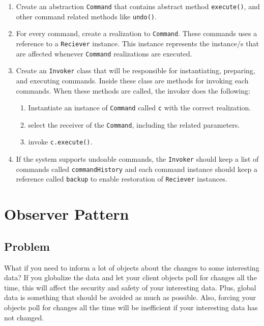 \begin{enumerate}
\def\labelenumi{\arabic{enumi}.}
\tightlist
\item
  Create an abstraction \texttt{Command} that contains abstract method
  \texttt{execute()}, and other command related methods like
  \texttt{undo()}.
\item
  For every command, create a realization to \texttt{Command}. These
  commands uses a reference to a \texttt{Reciever} instance. This
  instance represents the instance/s that are affected whenever
  \texttt{Command} realizations are executed.
\item
  Create an \texttt{Invoker} class that will be responsible for
  instantiating, preparing, and executing commands. Inside these class
  are methods for invoking each commands. When these methods are called,
  the invoker does the following:

  \begin{enumerate}
  \def\labelenumii{\arabic{enumii}.}
  \tightlist
  \item
    Instantiate an instance of \texttt{Command} called \texttt{c} with
    the correct realization.
  \item
    select the receiver of the \texttt{Command}, including the related
    parameters.
  \item
    invoke \texttt{c.execute()}.
  \end{enumerate}
\item
  If the system supports undoable commands, the \texttt{Invoker} should
  keep a list of commands called \texttt{commandHistory} and each
  command instance should keep a reference called \texttt{backup} to
  enable restoration of \texttt{Reciever} instances.
\end{enumerate}

\section{Observer
Pattern}\label{behavioral-patterns.md__observer-pattern}

\subsection{Problem}\label{behavioral-patterns.md__problem-3}

What if you need to inform a lot of objects about the changes to some
interesting data? If you globalize the data and let your client objects
poll for changes all the time, this will affect the security and safety
of your interesting data. Plus, global data is something that should be
avoided as much as possible. Also, forcing your objects poll for changes
all the time will be inefficient if your interesting data has not
changed.

